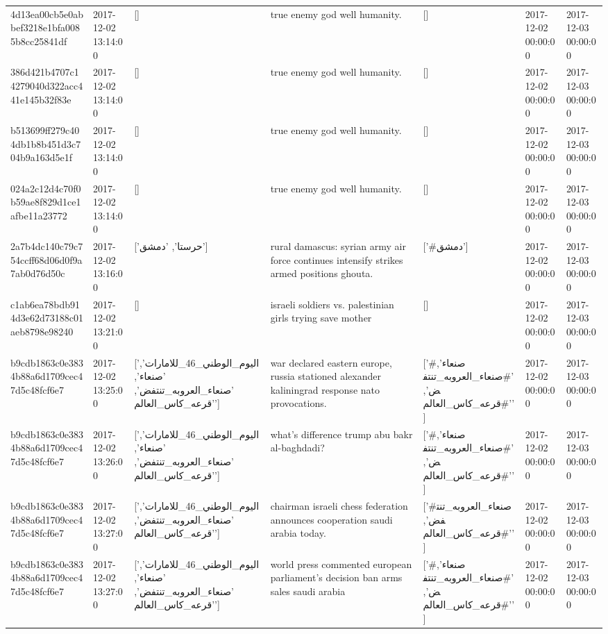 \begin{tabular}{lllllll}
4d13ea00cb5e0abbef3218e1bfa0085b8cc25841df & 2017-12-02 13:14:00 & [] & true enemy god well humanity. & [] & 2017-12-02 00:00:00 & 2017-12-03 00:00:00 \\
386d421b4707c14279040d322acc441e145b32f83e & 2017-12-02 13:14:00 & [] & true enemy god well humanity. & [] & 2017-12-02 00:00:00 & 2017-12-03 00:00:00 \\
b513699ff279c404db1b8b451d3c704b9a163d5e1f & 2017-12-02 13:14:00 & [] & true enemy god well humanity. & [] & 2017-12-02 00:00:00 & 2017-12-03 00:00:00 \\
024a2c12d4c70f0b59ae8f829d1ce1afbe11a23772 & 2017-12-02 13:14:00 & [] & true enemy god well humanity. & [] & 2017-12-02 00:00:00 & 2017-12-03 00:00:00 \\
2a7b4dc140c79c754ccff68d06d0f9a7ab0d76d50c & 2017-12-02 13:16:00 & ['حرستا', 'دمشق'] & rural damascus: syrian army air force continues intensify strikes armed positions ghouta. & ['#دمشق'] & 2017-12-02 00:00:00 & 2017-12-03 00:00:00 \\
c1ab6ea78bdb914d3e62d73188c01aeb8798e98240 & 2017-12-02 13:21:00 & [] & israeli soldiers vs. palestinian girls trying save mother & [] & 2017-12-02 00:00:00 & 2017-12-03 00:00:00 \\
b9cdb1863c0e3834b88a6d1709cec47d5c48fcf6e7 & 2017-12-02 13:25:00 & ['اليوم_الوطني_46_للامارات', 'صنعاء', 'صنعاء_العروبه_تنتفض', 'قرعه_كاس_العالم'] & war declared eastern europe, russia stationed alexander kaliningrad response nato provocations. & ['#صنعاء', '#صنعاء_العروبه_تنتفض', '#قرعه_كاس_العالم'] & 2017-12-02 00:00:00 & 2017-12-03 00:00:00 \\
b9cdb1863c0e3834b88a6d1709cec47d5c48fcf6e7 & 2017-12-02 13:26:00 & ['اليوم_الوطني_46_للامارات', 'صنعاء', 'صنعاء_العروبه_تنتفض', 'قرعه_كاس_العالم'] & what's difference trump abu bakr al-baghdadi? & ['#صنعاء', '#صنعاء_العروبه_تنتفض', '#قرعه_كاس_العالم'] & 2017-12-02 00:00:00 & 2017-12-03 00:00:00 \\
b9cdb1863c0e3834b88a6d1709cec47d5c48fcf6e7 & 2017-12-02 13:27:00 & ['اليوم_الوطني_46_للامارات', 'صنعاء_العروبه_تنتفض', 'قرعه_كاس_العالم'] & chairman israeli chess federation announces cooperation saudi arabia today. & ['#صنعاء_العروبه_تنتفض', '#قرعه_كاس_العالم'] & 2017-12-02 00:00:00 & 2017-12-03 00:00:00 \\
b9cdb1863c0e3834b88a6d1709cec47d5c48fcf6e7 & 2017-12-02 13:27:00 & ['اليوم_الوطني_46_للامارات', 'صنعاء', 'صنعاء_العروبه_تنتفض', 'قرعه_كاس_العالم'] & world press commented european parliament's decision ban arms sales saudi arabia & ['#صنعاء', '#صنعاء_العروبه_تنتفض', '#قرعه_كاس_العالم'] & 2017-12-02 00:00:00 & 2017-12-03 00:00:00 \\

\end{tabular}
